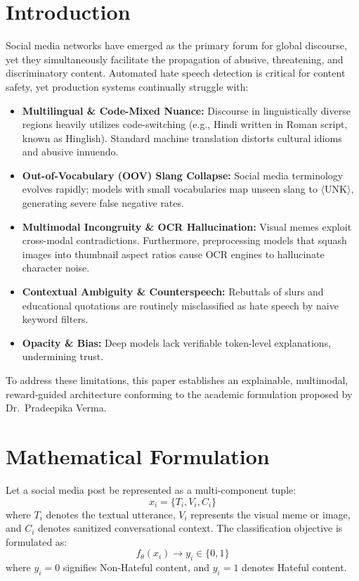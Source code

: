 \documentclass[11pt]{article}
\begin{document}
\section{Introduction}
Social media networks have emerged as the primary forum for global discourse, yet they simultaneously facilitate the propagation of abusive, threatening, and discriminatory content. Automated hate speech detection is critical for content safety, yet production systems continually struggle with:
\begin{itemize}
    \item \textbf{Multilingual \& Code-Mixed Nuance:} Discourse in linguistically diverse regions heavily utilizes code-switching (e.g., Hindi written in Roman script, known as Hinglish). Standard machine translation distorts cultural idioms and abusive innuendo.
    \item \textbf{Out-of-Vocabulary (OOV) Slang Collapse:} Social media terminology evolves rapidly; models with small vocabularies map unseen slang to $\langle\text{UNK}\rangle$, generating severe false negative rates.
    \item \textbf{Multimodal Incongruity \& OCR Hallucination:} Visual memes exploit cross-modal contradictions. Furthermore, preprocessing models that squash images into thumbnail aspect ratios cause OCR engines to hallucinate character noise.
    \item \textbf{Contextual Ambiguity \& Counterspeech:} Rebuttals of slurs and educational quotations are routinely misclassified as hate speech by naive keyword filters.
    \item \textbf{Opacity \& Bias:} Deep models lack verifiable token-level explanations, undermining trust.
\end{itemize}

To address these limitations, this paper establishes an explainable, multimodal, reward-guided architecture conforming to the academic formulation proposed by Dr.~Pradeepika Verma.

\section{Mathematical Formulation}
Let a social media post be represented as a multi-component tuple:
\begin{equation}
    x_i = \{T_i, V_i, C_i\}
\end{equation}
where $T_i$ denotes the textual utterance, $V_i$ represents the visual meme or image, and $C_i$ denotes sanitized conversational context. The classification objective is formulated as:
\begin{equation}
    f_\theta(x_i) \to y_i \in \{0, 1\}
\end{equation}
where $y_i = 0$ signifies Non-Hateful content, and $y_i = 1$ denotes Hateful content.
\end{document}
